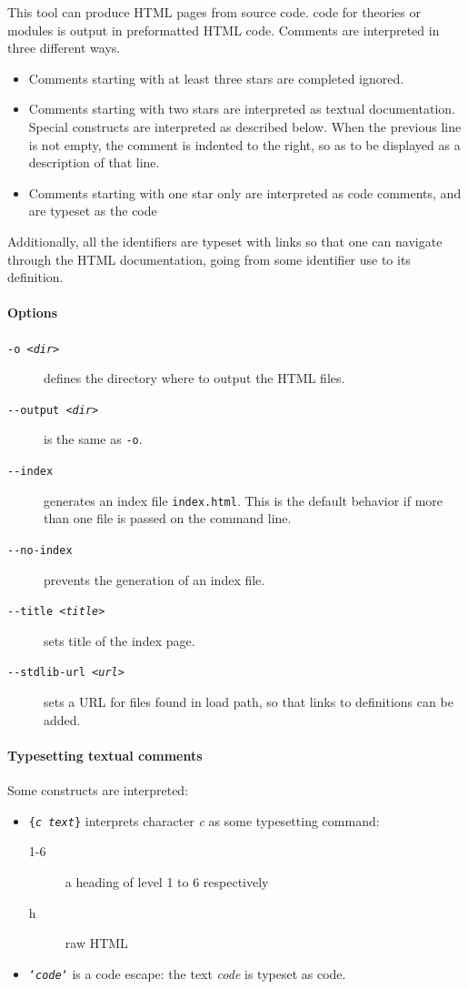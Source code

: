 This tool can produce HTML pages from \why source code.
\why code for theories or modules is output in
preformatted HTML code. Comments are interpreted in three different ways.
\begin{itemize}
\item Comments starting with at least three stars are completed
  ignored.
\item Comments starting with two stars are interpreted as textual
  documentation. Special constructs are interpreted as described
  below. When the previous line is not empty, the comment is indented to
  the right, so as to be displayed as a description of that line.
\item Comments starting with one star only are interpreted as code
  comments, and are typeset as the code
\end{itemize}

Additionally, all the \why identifiers are typeset with links so that
one can navigate through the HTML documentation, going from some
identifier use to its definition.

\paragraph{Options}

\begin{description}
\item[\texttt{-o \textsl{<dir>}}] defines the directory where to
  output the HTML files.
\item[\texttt{-{}-output \textsl{<dir>}}] is the same as \verb|-o|.
\item[\texttt{-{}-index}] generates an index file \texttt{index.html}.
  This is the default behavior if more than one file
  is passed on the command line.
\item[\texttt{-{}-no-index}] prevents the generation of an index file.
\item[\texttt{-{}-title \textsl{<title>}}] sets title of the
  index page.
\item[\texttt{-{}-stdlib-url \textsl{<url>}}] sets a URL for files
  found in load path, so that links to definitions can be added.
\end{description}

\paragraph{Typesetting textual comments}

Some constructs are interpreted:
\begin{itemize}
\item \texttt{\{\textsl{c text}\}} interprets character \textsl{c} as
  some typesetting command:
  \begin{description}
  \item[1-6] a heading of level 1 to 6 respectively
  \item[h] raw HTML
  \end{description}
\item \texttt{`\textsl{code}`} is a code escape: the text
  \textsl{code} is typeset as \why code.
\end{itemize}

